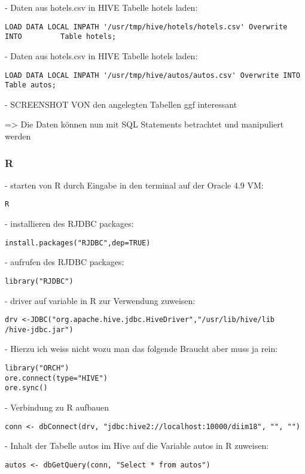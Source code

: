 - Daten aus hotels.csv in HIVE Tabelle hotels laden:
\begin{lstlisting}
LOAD DATA LOCAL INPATH '/usr/tmp/hive/hotels/hotels.csv' Overwrite INTO         Table hotels;
\end{lstlisting}

- Daten aus hotels.csv in HIVE Tabelle hotels laden:
\begin{lstlisting}
LOAD DATA LOCAL INPATH '/usr/tmp/hive/autos/autos.csv' Overwrite INTO   Table autos;
\end{lstlisting}
- SCREENSHOT VON den angelegten Tabellen ggf interessant

=> Die Daten können nun mit SQL Statements betrachtet und manipuliert werden

\subsubsection*{R}

- starten von R durch Eingabe in den terminal auf der Oracle 4.9 VM:
\begin{lstlisting}
R
\end{lstlisting}

- installieren des RJDBC packages:
\begin{lstlisting}
install.packages("RJDBC",dep=TRUE)
\end{lstlisting}

- aufrufen des RJDBC packages:
\begin{lstlisting}
library("RJDBC")
\end{lstlisting}

- driver auf variable in R zur Verwendung zuweisen:
\begin{lstlisting}
drv <-JDBC("org.apache.hive.jdbc.HiveDriver","/usr/lib/hive/lib         /hive-jdbc.jar")
\end{lstlisting}

- Hierzu ich weiss nicht wozu man das folgende Braucht aber muss ja rein:

\begin{lstlisting}
library("ORCH")
ore.connect(type="HIVE")
ore.sync()
\end{lstlisting}

- Verbindung zu R aufbauen
\begin{lstlisting}
conn <- dbConnect(drv, "jdbc:hive2://localhost:10000/diim18", "", "")
\end{lstlisting}

- Inhalt der Tabelle autos im Hive auf die Variable autos in R zuweisen:
\begin{lstlisting}
autos <- dbGetQuery(conn, "Select * from autos")
\end{lstlisting}

